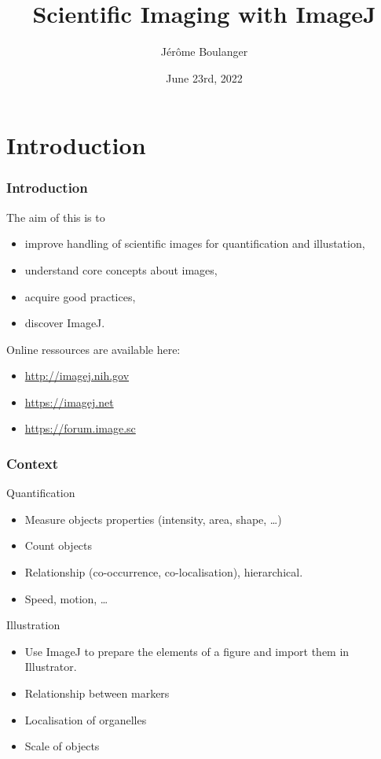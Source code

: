 \documentclass[ignorenonframetext,aspectratio=169,10pt,xcolor=table]{beamer}
\title{Scientific Imaging with ImageJ}
\author{J\'er\^ome Boulanger}
\date{June 23rd, 2022}
\begin{document}
\begin{frame}
  \maketitle
\end{frame}

\section{Introduction}

\begin{frame} \frametitle<presentation>{Introduction} The aim of this
   is to
  \begin{itemize}
  \item improve handling of scientific images for quantification and
    illustation,
  \item understand core concepts about images,
  \item acquire good practices,
  \item discover ImageJ.
  \end{itemize} Online ressources are available here:
  \begin{itemize}
  \item \url{http://imagej.nih.gov}
  \item \url{https://imagej.net}
  \item \url{https://forum.image.sc}
  \end{itemize}
\end{frame}

\begin{frame} \frametitle{Context}
  \begin{block}{Quantification}
    \begin{itemize}
    \item Measure objects properties (intensity, area, shape, \dots)
    \item Count objects
    \item Relationship (co-occurrence, co-localisation), hierarchical.
    \item Speed, motion, \dots
    \end{itemize}
  \end{block}
  \begin{block}{Illustration}

    \begin{itemize}
    \item Use ImageJ to prepare the elements of a figure and import
      them in Illustrator.
    \item Relationship between markers
    \item Localisation of organelles
    \item Scale of objects
    \end{itemize}
  \end{block}
\end{frame}
\end{document}
